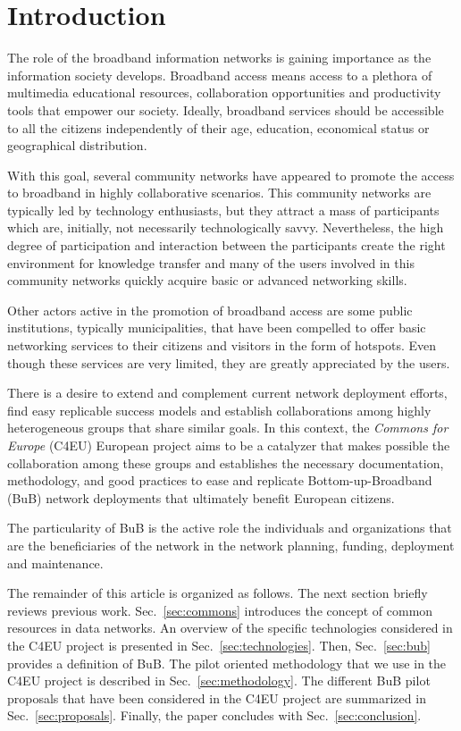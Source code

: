 \documentclass[conference]{IEEEtran}
\begin{document}
\section{Introduction}
The role of the broadband information networks is gaining importance as the information society develops.
Broadband access means access to a plethora of multimedia educational resources, collaboration opportunities and productivity tools that empower our society.
Ideally, broadband services should be accessible to all the citizens independently of their age, education, economical status or geographical distribution.

With this goal, several community networks have appeared to promote the access to broadband in highly collaborative scenarios.
This community networks are typically led by technology enthusiasts, but they attract a mass of participants which are, initially, not necessarily technologically savvy. 
Nevertheless, the high degree of participation and interaction between the participants create the right environment for knowledge transfer and many of the users involved in this community networks quickly acquire basic or advanced networking skills.

Other actors active in the promotion of broadband access are some public institutions, typically municipalities, that have been compelled to offer basic networking services to their citizens and visitors in the form of hotspots.
Even though these services are very limited, they are greatly appreciated by the users.

There is a desire to extend and complement current network deployment efforts, find easy replicable success models and establish collaborations among highly heterogeneous groups that share similar goals.
In this context, the \emph{Commons for Europe} (C4EU) European project aims to be a catalyzer that makes possible the collaboration among these groups and establishes the necessary documentation, methodology, and good practices to ease and replicate Bottom-up-Broadband (BuB) network deployments that ultimately benefit European citizens.

The particularity of BuB is the active role the individuals and organizations that are the beneficiaries of the network in the network planning, funding, deployment and maintenance.

The remainder of this article is organized as follows.
The next section briefly reviews previous work.
Sec.~\ref{sec:commons} introduces the concept of common resources in data networks.
An overview of the specific technologies considered in the C4EU project is presented in Sec.~\ref{sec:technologies}.
Then, Sec.~\ref{sec:bub} provides a definition of BuB.
The pilot oriented methodology that we use in the C4EU project is described in Sec.~\ref{sec:methodology}.
The different BuB pilot proposals that have been considered in the C4EU project are summarized in Sec.~\ref{sec:proposals}.
Finally, the paper concludes with Sec.~\ref{sec:conclusion}.
\end{document}
